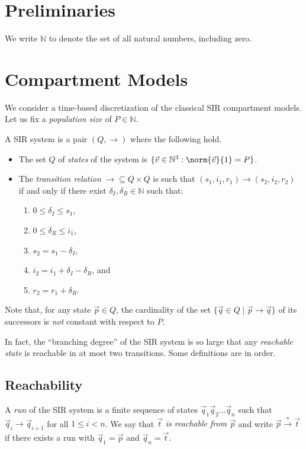 \section{Preliminaries}
We write $\mathbb{N}$ to denote the set of all natural numbers, including zero.

\section{Compartment Models}
We consider a time-based discretization of the classical SIR compartment models. Let us fix a \emph{population size} of $P \in \mathbb{N}$.

\begin{definition}
    A SIR system is a pair $(Q,\rightarrow)$ where the following hold.
    \begin{itemize}
        \item The set $Q$ of \emph{states} of the system is $\{\vec{v} \in \mathbb{N}^3 : \norm{\vec{v}}{1} = P\}$.
        \item The \emph{transition relation} ${}\rightarrow{} \subseteq Q \times Q$ is such that $(s_1,i_1,r_1) \rightarrow (s_2,i_2,r_2)$ if and only if there exist $\delta_I,\delta_R \in \mathbb{N}$ such that:
        \begin{enumerate}
            \item $0 \leq \delta_I \leq s_1$,
            \item $0 \leq \delta_R \leq i_1$,
            \item $s_2 = s_1 - \delta_I$,
            \item $i_2 = i_1 + \delta_I - \delta_R$, and
            \item $r_2 = r_1 + \delta_R$.
        \end{enumerate}
    \end{itemize}
\end{definition}
Note that, for any state $\vec{p} \in Q$, the cardinality of the set $\{\vec{q} \in Q \mid \vec{p} \rightarrow \vec{q}\}$ of its successors is \emph{not} constant with respect to $P$.

In fact, the ``branching degree'' of the SIR system is so large that any \emph{reachable state} is reachable in at most two transitions. Some definitions are in order.

\subsection{Reachability}
A \emph{run} of the SIR system is a finite sequence of states $\vec{q}_1 \vec{q}_2 \dots \vec{q}_n$ such that $\vec{q}_i \rightarrow \vec{q}_{i+1}$ for all $1 \leq i < n$. We say that \emph{$\vec{t}$ is reachable from $\vec{p}$} and write $\vec{p} \xrightarrow{*} \vec{t}$ if there exists a run with $\vec{q}_1 = \vec{p}$ and $\vec{q}_n = \vec{t}$.

